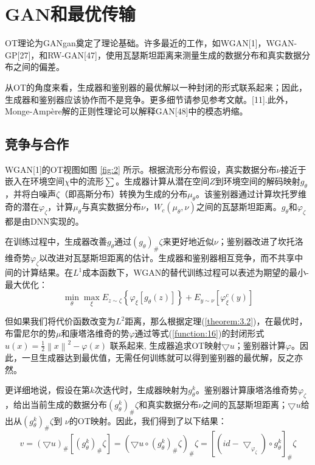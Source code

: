 
\section{GAN和最优传输}

OT理论为GANgan奠定了理论基础。许多最近的工作，如WGAN[1]，WGAN-GP[27]，和RW-GAN[47]，使用瓦瑟斯坦距离来测量生成的数据分布和真实数据分布之间的偏差。

从OT的角度来看，生成器和鉴别器的最优解以一种封闭的形式联系起来；因此，生成器和鉴别器应该协作而不是竞争。更多细节请参见参考文献。[11].此外，Monge-Ampère解的正则性理论可以解释GAN[48]中的模态坍缩。

\subsection{竞争与合作}

WGAN[1]的OT视图如图 \ref{fig:2} 所示。根据流形分布假设，真实数据分布$\nu$接近于嵌入在环境空间$\chi $中的流形$\sum$。生成器计算从潜在空间$Z$到环境空间的解码映射$g_\theta$，并将白噪声$\zeta$（即高斯分布）转换为生成的分布$\mu _{\theta}$。该鉴别器通过计算坎托罗维奇的潜在$\varphi _{\zeta}$，计算$\mu _{\theta}$与真实数据分布$\nu$，$W_c(\mu _{\theta},\nu)$之间的瓦瑟斯坦距离。$g_{\theta}$和$\varphi _{\zeta}$都是由DNN实现的。

在训练过程中，生成器改善$g_{\theta}$通过$(g_{\theta})_{\#} \zeta$来更好地近似$\nu$；鉴别器改进了坎托洛维奇势$\varphi _{\zeta}$以改进对瓦瑟斯坦距离的估计。生成器和鉴别器相互竞争，而不共享中间的计算结果。在$L^1$成本函数下，WGAN的替代训练过程可以表述为期望的最小-最大优化：
\begin{equation*}
	\min_{\theta } \max_{\xi } E_{z\sim \zeta } \left \{ \varphi _{\xi } \left [ g_{\theta } (z) \right ]   \right \} + E_{y\sim \nu}\left [ \varphi_{\xi}^c (y) \right ]  
\end{equation*}

但如果我们将代价函数改变为$L^2$距离，那么根据定理(\ref{theorem:3.2})，在最优时，布雷尼尔的势$\mu$和康塔洛维奇的势$\varphi$通过等式(\ref{function:16})的封闭形式 $u(x)=\frac{1}{2} \left \| x \right \|^2 -\varphi(x)$ 联系起来, 生成器追求OT映射$\bigtriangledown u$；鉴别器计算$\varphi$。因此，一旦生成器达到最优值，无需任何训练就可以得到鉴别器的最优解，反之亦然。

更详细地说，假设在第$k$次迭代时，生成器映射为$g_{\theta}^k$。鉴别器计算康塔洛维奇势$\varphi_{\zeta}$，给出当前生成的数据分布$\left ( g_{\theta}^k \right )_{\#} \zeta $和真实数据分布$\nu$之间的瓦瑟斯坦距离；$\bigtriangledown u$给出从$\left ( g_{\theta}^k \right )_{\#} \zeta $到 $\nu$的OT映射。因此，我们得到了以下结果：
\begin{equation*}
	v=(\bigtriangledown u)_{\#} \left [ \left ( g_{\theta}^k \right )_{\#} \zeta \right ] =\left ( \bigtriangledown u\circ \left ( g_{\theta}^k \right )_{\#} \zeta \right )_{\#} \zeta =\left [ (id-\bigtriangledown _{\varphi _{\zeta}}) \circ g_{\theta}^k \right ] _{\#} \zeta
\end{equation*}

